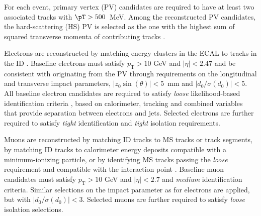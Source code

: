For each event, primary vertex (PV) candidates 
are required to have at least two associated tracks with \mbox{$\pT > 500$ MeV}. Among the reconstructed PV candidates, the hard-scattering (HS) PV is selected as the one with the highest sum of squared transverse momenta of contributing tracks \cite{ATL-PHYS-PUB-2015-026}.

Electrons are reconstructed by matching energy clusters in the ECAL to tracks in the
ID \cite{EGAM-2018-01,
PERF-2017-03}. Baseline electrons must satisfy $p_{\mathrm{T}}>10$ GeV and $|\eta|<2.47$ and be consistent with originating from the PV through requirements on the longitudinal and transverse impact parameters, $|z_0\sin(\theta)|<5$~mm and $|d_0/\sigma(d_0)|<5$. All baseline electron candidates are required to satisfy \textit{loose} likelihood-based identification criteria \cite{PERF-2013-03}, based on calorimeter, tracking and combined variables that provide separation between electrons and jets. Selected electrons are further required to satisfy \textit{tight} identification and \textit{tight} isolation requirements.

Muons are reconstructed by matching ID tracks to MS tracks or track segments, by matching ID tracks to calorimeter energy deposits compatible with a minimum-ionizing particle, or by identifying MS tracks
passing the \textit{loose} requirement and compatible with the interaction point \cite{MUON-2018-03,PERF-2015-10}. Baseline muon candidates must satisfy $p_{\mathrm{T}}>10$ GeV and $|\eta|<2.7$ and \textit{medium} identification criteria. Similar selections on the impact parameter as for electrons are applied, but with $|d_0/\sigma(d_0)| < 3$. Selected muons are further required to satisfy \textit{loose} isolation selections. 

